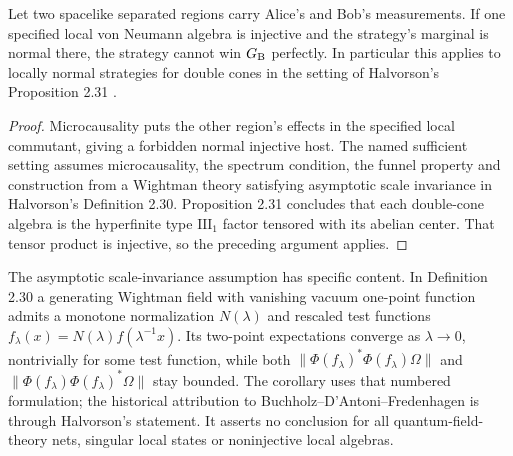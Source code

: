 \begin{corollary}\label{cor:qft}
Let two spacelike separated regions carry Alice's and Bob's measurements. If one specified local von Neumann algebra is injective and the strategy's marginal is normal there, the strategy cannot win $G_{\mathrm B}$ perfectly. In particular this applies to locally normal strategies for double cones in the setting of Halvorson's Proposition 2.31 \cite{Halvorson}.
\end{corollary}
\begin{proof}
Microcausality puts the other region's effects in the specified local commutant, giving a forbidden normal injective host. The named sufficient setting assumes microcausality, the spectrum condition, the funnel property and construction from a Wightman theory satisfying asymptotic scale invariance in Halvorson's Definition 2.30. Proposition 2.31 concludes that each double-cone algebra is the hyperfinite type $\mathrm{III}_1$ factor tensored with its abelian center. That tensor product is injective, so the preceding argument applies.
\end{proof}
The asymptotic scale-invariance assumption has specific content. In Definition 2.30 a generating Wightman field with vanishing vacuum one-point function admits a monotone normalization $N(\lambda)$ and rescaled test functions $f_\lambda(x)=N(\lambda)f(\lambda^{-1}x)$. Its two-point expectations converge as $\lambda\to0$, nontrivially for some test function, while both $\|\Phi(f_\lambda)^*\Phi(f_\lambda)\Omega\|$ and $\|\Phi(f_\lambda)\Phi(f_\lambda)^*\Omega\|$ stay bounded. The corollary uses that numbered formulation; the historical attribution to Buchholz--D'Antoni--Fredenhagen is through Halvorson's statement. It asserts no conclusion for all quantum-field-theory nets, singular local states or noninjective local algebras.
